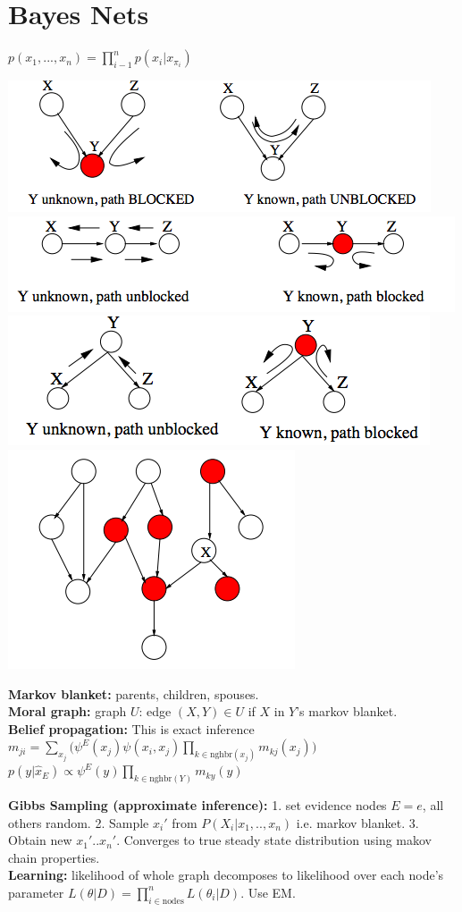 \section{Bayes Nets}
$p(x_1, ..., x_{n}) = \prod_{i-1}^{n} p(x_i \vert x_{\pi_i})$

\includegraphics[width=0.5\linewidth]{path_1.png}
\includegraphics[width=0.5\linewidth]{path_2.png}
\includegraphics[width=0.5\linewidth]{path_3.png}
\includegraphics[width=0.3\linewidth]{markov_blanket.png}

{\bf Markov blanket: } parents, children, spouses. \\
{\bf Moral graph: } graph $U$: edge $(X, Y) \in U$ if $X$ in $Y$'s markov blanket. \\
{\bf Belief propagation: } This is exact inference $m_{ji} = \sum_{x_j} \bigg( \psi^E(x_j)\psi(x_i, x_j) \prod_{k \in \text{nghbr}(x_j)} m_{kj}(x_j)\bigg)$\\
$p(y \vert \hat{x}_{E}) \propto \psi^{E}(y) \prod_{k \in \text{nghbr}(Y)} m_{ky}(y)$

{\bf Gibbs Sampling (approximate inference):} 1. set evidence nodes $E = e$, all others random. 2. Sample $x_{i}'$ from $P(X_{i} \vert x_1, .., x_n)$ i.e. markov blanket. 3. Obtain new $x_{1}'..x_{n}'$. Converges to true steady state distribution using makov chain properties.\\
{\bf Learning: } likelihood of whole graph decomposes to likelihood over each node's parameter $L(\theta \vert D) = \prod_{i \in \text{nodes}}^{n} L(\theta_i \vert D)$. Use EM.
